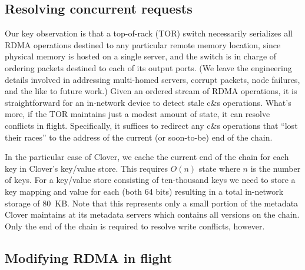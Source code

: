 
\subsection{Resolving concurrent requests}

Our key observation is that a top-of-rack (TOR) switch necessarily
serializes all RDMA operations destined to any particular remote memory
location, since physical memory is hosted on a single server, and the
switch is in charge of ordering packets destined to each of its output
ports.  (We leave the engineering details involved in addressing
multi-homed servers, corrupt packets, node failures, and the like to
future work.)  Given an ordered stream of RDMA operations, it is
straightforward for an in-network device to detect stale c\&s
operations.  What's more, if the TOR maintains just a modest amount of
state, it can resolve conflicts in flight.  Specifically, it suffices
to redirect any c\&s operations that ``lost their races'' to the
address of the current (or soon-to-be) end of the chain.



In the particular case of Clover, we cache the current end of the
chain for each key in Clover's key/value store. This requires $O(n)$
state where $n$ is the number of keys. For a key/value
store consisting of ten-thousand keys we need to store a key mapping
and value for each (both 64 bits) resulting in a total in-network
storage of 80~KB.  Note that this represents only a small portion of
the metadata Clover maintains at its metadata servers which contains
all versions on the chain.  Only the end of the chain is required to
resolve write conflicts, however.


\subsection{Modifying RDMA in flight}

